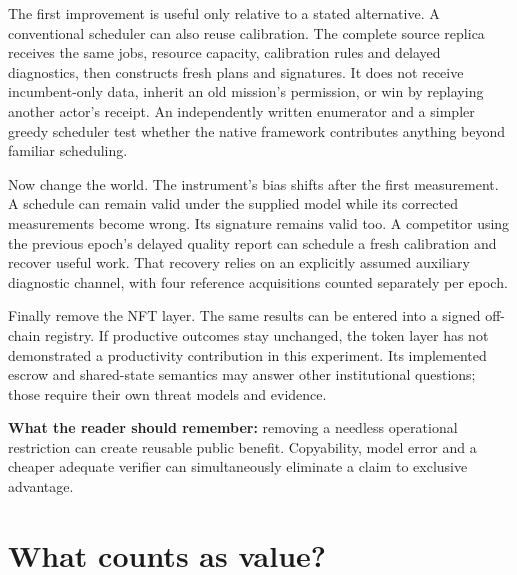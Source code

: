 \documentclass[11pt]{article}
\begin{document}
The first improvement is useful only relative to a stated alternative. A conventional scheduler can also reuse calibration. The complete source replica receives the same jobs, resource capacity, calibration rules and delayed diagnostics, then constructs fresh plans and signatures. It does not receive incumbent-only data, inherit an old mission's permission, or win by replaying another actor's receipt. An independently written enumerator and a simpler greedy scheduler test whether the native framework contributes anything beyond familiar scheduling.

Now change the world. The instrument's bias shifts after the first measurement. A schedule can remain valid under the supplied model while its corrected measurements become wrong. Its signature remains valid too. A competitor using the previous epoch's delayed quality report can schedule a fresh calibration and recover useful work. That recovery relies on an explicitly assumed auxiliary diagnostic channel, with four reference acquisitions counted separately per epoch.

Finally remove the NFT layer. The same results can be entered into a signed off-chain registry. If productive outcomes stay unchanged, the token layer has not demonstrated a productivity contribution in this experiment. Its implemented escrow and shared-state semantics may answer other institutional questions; those require their own threat models and evidence.

\textbf{What the reader should remember:} removing a needless operational restriction can create reusable public benefit. Copyability, model error and a cheaper adequate verifier can simultaneously eliminate a claim to exclusive advantage.

\section{What counts as value?}
\end{document}

